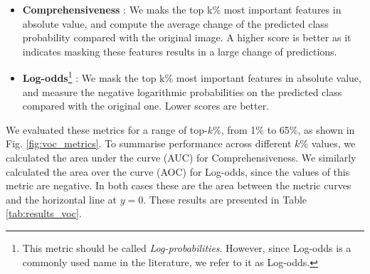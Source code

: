 \begin{itemize}
    \item \textbf{Comprehensiveness} \citep{deyoung2019eraser}: We maks the top k\% most important features in absolute value, and compute the average change of the predicted class probability compared with the original image. A higher score is better as it indicates masking these features results in a large change of predictions.

    \item \textbf{Log-odds}\footnote{This metric should be called \emph{Log-probabilities}. However, since Log-odds is a commonly used name in the literature, we refer to it as Log-odds.} \citep{shrikumar2017learning}: We mask the top k\% most important features in absolute value, and measure the negative logarithmic probabilities on the predicted class compared with the original one. Lower scores are better.
\end{itemize}

\begin{table}[t]
	\centering
	\caption{Evaluation of different attribution methods on 100 randomly sampled images from the Pascal VOC test set. Fig. \ref{fig:voc_metrics} shows the curves where these metrics are extracted from.}
	\label{tab:results_voc}
\end{table}

We evaluated these metrics for a range of top-$k\%$, from 1\% to 65\%, as shown in Fig. \ref{fig:voc_metrics}. To summarise performance across different $k\%$ values, we calculated the area under the curve (AUC) for Comprehensiveness. We similarly calculated the area over the curve (AOC) for Log-odds, since the values of this metric are negative. In both cases these are the area between the metric curves and the horizontal line at $y=0$. These results are presented in Table \ref{tab:results_voc}.

